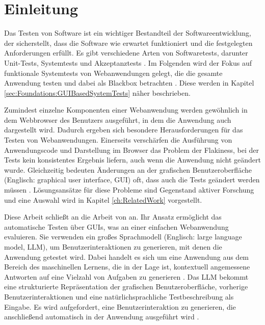 
\chapter{Einleitung}
\label{ch:Introduction}


Das Testen von Software ist ein wichtiger Bestandteil der Softwareentwicklung, der sicherstellt, dass die Software wie erwartet funktioniert und die festgelegten Anforderungen erfüllt.
Es gibt verschiedene Arten von Softwaretests, darunter Unit-Tests, Systemtests und Akzeptanztests \cite{Sommerville10}.
Im Folgenden wird der Fokus auf funktionale Systemtests von Webanwendungen gelegt, die die gesamte Anwendung testen und dabei als Blackbox betrachten \cite{Beizer1990}.
Diese werden in Kapitel \ref{sec:Foundations:GUIBasedSystemTests} näher beschrieben.


Zumindest einzelne Komponenten einer Webanwendung werden gewöhnlich in dem Webbrowser des Benutzers ausgeführt, in dem die Anwendung auch dargestellt wird.
Dadurch ergeben sich besondere Herausforderungen für das Testen von Webanwendungen.
Einerseits verschärfen die Ausführung von Anwendungscode und Darstellung im Browser das Problem der Flakiness, bei der Tests kein konsistentes Ergebnis liefern, auch wenn die Anwendung nicht geändert wurde.
Gleichzeitig bedeuten Änderungen an der grafischen Benutzeroberfläche (Englisch: graphical user interface, GUI) oft, dass auch die Tests geändert werden müssen \cite{ChallengesSelenium}.
Lösungsansätze für diese Probleme sind Gegenstand aktiver Forschung und eine Auswahl wird in Kapitel \ref{ch:RelatedWork} vorgestellt.


Diese Arbeit schließt an die Arbeit von  an.
Ihr Ansatz ermöglicht das automatische Testen über GUIs, was an einer einfachen Webanwendung evaluieren.
Sie verwenden ein großes Sprachmodell (Englisch: large language model, LLM), um Benutzerinteraktionen zu generieren, mit denen die Anwendung getestet wird.
Dabei handelt es sich um eine Anwendung aus dem Bereich des maschinellen Lernens, die in der Lage ist, kontextuell angemessene Antworten auf eine Vielzahl von Aufgaben zu generieren \cite{FewShotLearners}.
Das LLM bekommt eine strukturierte Repräsentation der grafischen Benutzeroberfläche, vorherige Benutzerinteraktionen und eine natürlichsprachliche Testbeschreibung als Eingabe.
Es wird aufgefordert, eine Benutzerinteraktion zu generieren, die anschließend automatisch in der Anwendung ausgeführt wird \cite{GPT3Testing}.

